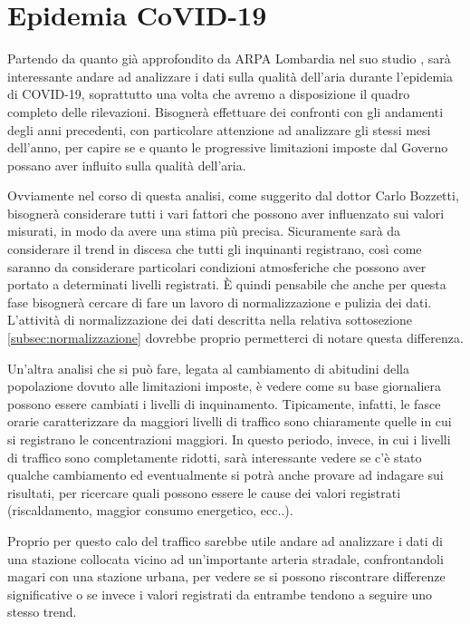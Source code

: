 \documentclass{article}
\begin{document}
\section{Epidemia CoVID-19}
\label{sec:covid}
Partendo da quanto già approfondito da ARPA Lombardia nel suo studio \cite{arpaCovid}, sarà interessante andare ad analizzare i dati sulla qualità dell'aria durante l'epidemia di COVID-19, soprattutto una volta che avremo a disposizione il quadro completo delle rilevazioni. Bisognerà effettuare dei confronti con gli andamenti degli anni precedenti, con particolare attenzione ad analizzare gli stessi mesi dell'anno, per capire se e quanto le progressive limitazioni imposte dal Governo possano aver influito sulla qualità dell'aria.

Ovviamente nel corso di questa analisi, come suggerito dal dottor Carlo Bozzetti, bisognerà considerare tutti i vari fattori che possono aver influenzato sui valori misurati, in modo da avere una stima più precisa. Sicuramente sarà da considerare il trend in discesa che tutti gli inquinanti registrano, così come saranno da considerare particolari condizioni atmosferiche che possono aver portato a determinati livelli registrati. È quindi pensabile che anche per questa fase bisognerà cercare di fare un lavoro di normalizzazione e pulizia dei dati.%
L'attività di normalizzazione dei dati descritta nella relativa sottosezione \ref{subsec:normalizzazione} dovrebbe proprio permetterci di notare questa differenza.

Un'altra analisi che si può fare, legata al cambiamento di abitudini della popolazione dovuto alle limitazioni imposte, è vedere come su base giornaliera possono essere cambiati i livelli di inquinamento. Tipicamente, infatti, le fasce orarie caratterizzare da maggiori livelli di traffico sono chiaramente quelle in cui si registrano le concentrazioni maggiori. In questo periodo, invece, in cui i livelli di traffico sono completamente ridotti, sarà interessante vedere se c'è stato qualche cambiamento ed eventualmente si potrà anche provare ad indagare sui risultati, per ricercare quali possono essere le cause dei valori registrati (riscaldamento, maggior consumo energetico, ecc..).

Proprio per questo calo del traffico sarebbe utile andare ad analizzare i dati di una stazione collocata vicino ad un'importante arteria stradale, confrontandoli magari con una stazione urbana, per vedere se si possono riscontrare differenze significative o se invece i valori registrati da entrambe tendono a seguire uno stesso trend.
\end{document}
